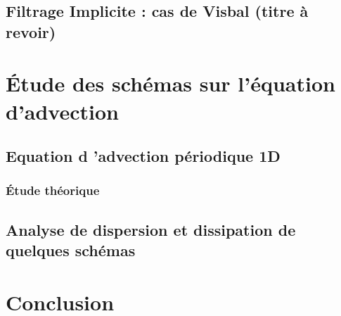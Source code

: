 \subsection{Filtrage Implicite : cas de Visbal (titre à revoir)}


\section{\'Etude des schémas sur l'équation d'advection}

\subsection{Equation d 'advection périodique 1D}

\subsubsection{\'Etude théorique}

\subsection{Analyse de dispersion et dissipation de quelques schémas}

\section{Conclusion}